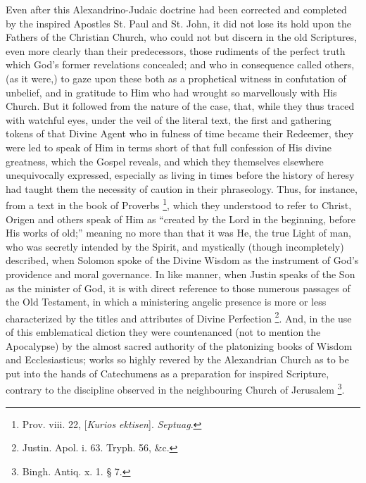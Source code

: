 Even after this Alexandrino-Judaic doctrine had been corrected and
completed by the inspired Apostles St. Paul and St. John, it did not
lose its hold upon the Fathers of the Christian Church, who could not
but discern in the old Scriptures, even more clearly than their
predecessors, those rudiments of the perfect truth which God's former
revelations concealed; and who in consequence called others, (as it
were,) to gaze upon these both as a prophetical witness in confutation
of unbelief, and in gratitude to Him who had wrought so marvellously
with His Church. But it followed from the nature of the case, that,
while they thus traced with watchful eyes, under the veil of the
literal text, the first and gathering tokens of that Divine Agent who
in fulness of time became their Redeemer, they were led to speak of
Him in terms short of that full confession of His divine
greatness, which the Gospel reveals, and which they themselves
elsewhere unequivocally expressed, especially as living in times
before the history of heresy had taught them the necessity of caution
in their phraseology. Thus, for instance, from a text in the book of
Proverbs \footnote{Prov. viii. 22, [\emph{Kurios ektisen}]. \emph{Septuag}.}, which they
understood to refer to Christ, Origen and others speak of Him as
``created by the Lord in the beginning, before His works of
old;'' meaning no more than that it was He, the true Light of man,
who was secretly intended by the Spirit, and mystically (though
incompletely) described, when Solomon spoke of the Divine Wisdom as
the instrument of God's providence and moral governance. In like
manner, when Justin speaks of the Son as the minister of God, it is
with direct reference to those numerous passages of the Old Testament,
in which a ministering angelic presence is more or less characterized
by the titles and attributes of Divine Perfection \footnote{Justin. Apol. i. 63. Tryph. 56, \&c.}. And, in the use of this emblematical diction they were
countenanced (not to mention the Apocalypse) by the almost sacred
authority of the platonizing books of Wisdom and Ecclesiasticus; works
so highly revered by the Alexandrian Church as to be put into the
hands of Catechumens as a preparation for inspired Scripture, contrary
to the discipline observed in the neighbouring Church of Jerusalem \footnote{Bingh. Antiq. x. 1. § 7.}.

